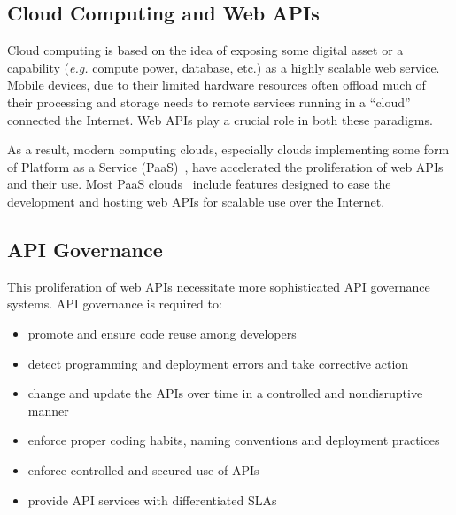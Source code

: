 \subsection{Cloud Computing and Web APIs}
Cloud computing is based on the idea of exposing some digital asset or a
capability ({\em e.g.} compute power, database, etc.) 
as a highly scalable web service.  Mobile
devices, due to their limited hardware resources often offload much of their
processing and storage needs to remote services running in a ``cloud''
connected the Internet.  Web APIs
play a crucial role in both these paradigms. 

As a result, modern computing clouds, especially clouds implementing some form
of Platform as a Service (PaaS)~\cite{XXXpassXXXX}, have accelerated the
proliferation of
web APIs and their use.  Most PaaS
clouds~\cite{XXXappscaleXXX,XXX,cloudfoundaryXXX,XXXopenshiftXXX} include
features designed to
ease the development and hosting web APIs for scalable use over the Internet. 

\subsection{API Governance}
This proliferation of web APIs necessitate more sophisticated API 
governance systems. API governance is required to:
\begin{itemize}
\item promote and ensure code reuse among developers
\item detect programming and deployment errors and take corrective action
\item change and update the APIs over time in a controlled and nondisruptive manner
\item enforce proper coding habits, naming conventions and deployment practices
\item enforce controlled and secured use of APIs
\item provide API services with differentiated SLAs
\end{itemize}

